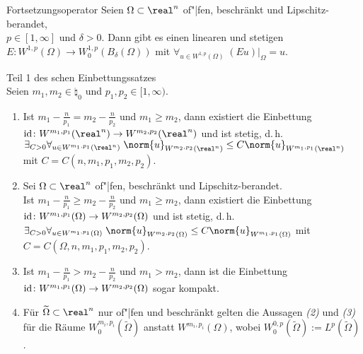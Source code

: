 \begin{Lemma}{Fortsetzungsoperator}
    Seien $\Omega \subset \real^n$ of"|fen, beschränkt und Lipschitz-berandet,\\
    $p \in [1, \infty]$ und $\delta > 0$.
    Dann gibt es einen linearen und stetigen \\
    $E\colon W^{1,p}(\Omega) \to W_0^{1,p}(B_\delta(\Omega))$ mit
    $\forall_{u \in W^{1,p}(\Omega)}\; (Eu)|_\Omega = u$.
\end{Lemma}

\begin{Satz}{Teil 1 des schen Einbettungssatzes}\\
    Seien $m_1, m_2 \in \natural_0$ und $p_1, p_2 \in [1, \infty)$.
    \begin{enumerate}
        \item
        Ist $m_1 - \frac{n}{p_1} = m_2 - \frac{n}{p_2}$ und $m_1 \ge m_2$, dann existiert die
        Einbettung\\
        $\id\colon W^{m_1,p_1}(\real^n) \to W^{m_2,p_2}(\real^n)$ und ist stetig, d.\,h.\\
        $\exists_{C > 0} \forall_{u \in W^{m_1,p_1}(\real^n)}\;
        \norm{u}_{W^{m_2,p_2}(\real^n)} \le C \norm{u}_{W^{m_1,p_1}(\real^n)}$ mit
        $C = C(n, m_1, p_1, m_2, p_2)$.
        
        \item
        Sei $\Omega \subset \real^n$ of"|fen, beschränkt und Lipschitz-berandet.\\
        Ist $m_1 - \frac{n}{p_1} \ge m_2 - \frac{n}{p_2}$ und $m_1 \ge m_2$, dann existiert die
        Einbettung\\
        $\text{id}\colon W^{m_1,p_1}(\Omega) \to W^{m_2,p_2}(\Omega)$ und ist stetig, d.\,h.\\
        $\exists_{C > 0} \forall_{u \in W^{m_1,p_1}(\Omega)}\;
        \norm{u}_{W^{m_2,p_2}(\Omega)} \le C \norm{u}_{W^{m_1,p_1}(\Omega)}$ mit
        $C = C(\Omega, n, m_1, p_1, m_2, p_2)$.
        
        \item
        Ist $m_1 - \frac{n}{p_1} > m_2 - \frac{n}{p_2}$ und $m_1 > m_2$, dann ist die Einbettung
        $\text{id}\colon W^{m_1,p_1}(\Omega) \to W^{m_2,p_2}(\Omega)$ sogar kompakt.
        
        \item
        Für $\widetilde{\Omega} \subset \real^n$ nur of"|fen und beschränkt gelten die Aussagen
        \emph{(2)} und \emph{(3)} für die Räume $W^{m_i,p_i}_0(\widetilde{\Omega})$ anstatt
        $W^{m_i,p_i}(\Omega)$, wobei $W^{0,p}_0(\widetilde{\Omega}) := L^p(\widetilde{\Omega})$.
    \end{enumerate}
\end{Satz}


